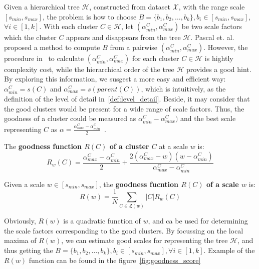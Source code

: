 Given a hierarchical tree $\mathcal{H}$, constructed from dataset $\mathcal{X}$, with the range scale $[s_{min},s_{max}]$, the problem is how to choose $\mathsf{\textit{B}} = \{b_1, b_2, \ldots, b_k\}, b_i \in [s_{min},s_{max}]$, $\forall i \in [1,k]$. With each cluster $C \in \mathcal{H}$, let $(\alpha_{min}^C,\alpha_{max}^C)$ be two scale factors which the cluster $C$ appears and disappears from the tree $\mathcal{H}$. Pascal et. al.~\cite{pons2011postprocessing} proposed a method to compute $\mathsf{\textit{B}}$ from a pairwise $(\alpha_{min}^C,\alpha_{max}^C)$. However, the procedure in~\cite{pons2011postprocessing} to calculate $(\alpha_{min}^C,\alpha_{max}^C)$ for each cluster $C \in \mathcal{H}$ is hightly complexity cost, while the hierarchical order of the tree $\mathcal{H}$ provides a good hint. By exploring this information, we susgest a more easy and efficient way: $\alpha_{min}^C = s(C)$ and $\alpha_{max}^C = s(parent(C))$, which is intuitively, as the definition of the level of detail in~\ref{def:level_detail}. Beside, it may consider that the good clusters would be present for a wide range of scale factors. Thus, the goodness of a cluster could be measured as $\alpha_{min}^C - \alpha_{max}^C)$ and the best scale representing $C$ as $\alpha = \frac{\alpha_{max}^C-\alpha_{min}^C}{2}$~\cite{pons2011postprocessing}.
\begin{definition}
\label{def:goodness_cluster} The \textbf{goodness function $R(C)$ of a cluster $C$} at a scale $w$ is:
\begin{equation}
\label{equ:goodness_cluster}
R_{w}(C) = \frac{\alpha_{max}^C-\alpha_{min}^C}{2} + \frac{2(\alpha_{max}^C- w)(w - \alpha_{min}^C)}{\alpha_{max}^C-\alpha_{min}^C}
\end{equation}
\end{definition}
\begin{definition}
\label{def:goodness_scale} Given a scale $w \in [s_{min},s_{max}]$, the \textbf{goodness fucntion $R(C)$ of a scale $w$} is:
\begin{equation}
\label{equ:goodness_scale}
R(w) = \frac{1}{N}\sum_{C \in \mathfrak{L}(w)} |C|R_{w}(C)
\end{equation}
\end{definition}
Obviously, $R(w)$ is a quadratic function of $w$, and ca be used for determining the scale factors corresponding to the good clusters. By focussing on the local maxima of $R(w)$, we can estimate good scales for representing the tree $\mathcal{H}$, and thus getting the $\mathsf{\textit{B}} = \{b_1, b_2, \ldots, b_k\}, b_i \in [s_{min},s_{max}], \forall i \in [1,k]$. Example of the $R(w)$ function can be found in the figure~\ref{fig:goodness_score}


